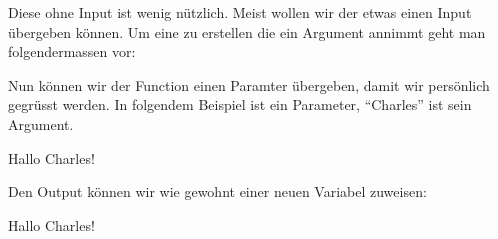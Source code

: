 \documentclass[letterpaper,10pt,english]{sphinxmanual}
\begin{document}
Diese  ohne Input ist wenig nützlich. Meist wollen wir der  etwas \sphinxhyphen{} einen Input \sphinxhyphen{} übergeben können. Um eine  zu erstellen die ein Argument annimmt geht man folgendermassen vor:

\begin{sphinxVerbatim}[commandchars=\\\{\}]
 
\end{sphinxVerbatim}

Nun können wir der Function einen Paramter übergeben, damit wir persönlich gegrüsst werden. In folgendem Beispiel ist  ein Parameter, “Charles” ist sein Argument.

\begin{sphinxVerbatim}[commandchars=\\\{\}]
\end{sphinxVerbatim}

\begin{sphinxVerbatim}[commandchars=\\\{\}]
\PYGZsq{}Hallo Charles!\PYGZsq{}
\end{sphinxVerbatim}

Den Output können wir wie gewohnt einer neuen Variabel zuweisen:

\begin{sphinxVerbatim}[commandchars=\\\{\}]
  
\end{sphinxVerbatim}

\begin{sphinxVerbatim}[commandchars=\\\{\}]
\PYGZsq{}Hallo Charles!\PYGZsq{}
\end{sphinxVerbatim}







\renewcommand{\indexname}{Index}
\printindex
\end{document}
